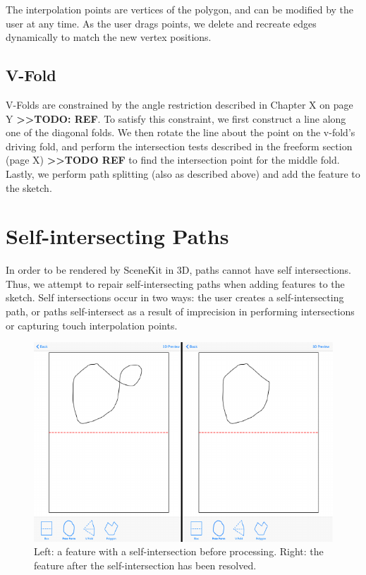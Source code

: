 The interpolation points are vertices of the polygon, and can be
modified by the user at any time. As the user drags points, we delete
and recreate edges dynamically to match the new vertex positions.

\subsection{V-Fold}\label{v-fold}

V-Folds are constrained by the angle restriction described in Chapter X
on page Y \textbf{\textgreater{}\textgreater{}TODO: REF}. To satisfy
this constraint, we first construct a line along one of the diagonal
folds. We then rotate the line about the point on the v-fold's driving
fold, and perform the intersection tests described in the freeform
section (page X) \textbf{\textgreater{}\textgreater{}TODO REF} to find
the intersection point for the middle fold. Lastly, we perform path
splitting (also as described above) and add the feature to the sketch.

\section{Self-intersecting Paths}\label{self-intersecting-paths}

In order to be rendered by SceneKit in 3D, paths cannot have self
intersections. Thus, we attempt to repair self-intersecting paths when
adding features to the sketch. Self intersections occur in two ways: the
user creates a self-intersecting path, or paths self-intersect as a
result of imprecision in performing intersections or capturing touch
interpolation points. ~ ~

\begin{figure}[htbp]
\centering
\includegraphics{figures/41_Tech_Tool_Implementation/loopBeforeAfter.pdf}
\caption{Left: a feature with a self-intersection before processing.
Right: the feature after the self-intersection has been resolved.}
\end{figure}

